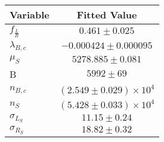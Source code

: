 \begin{tabular}[t]{lc}
\hline
Variable &Fitted Value\\
\hline\hline
$f_{\frac{L}{R}}$&$0.461\pm0.025$\\
\hline
$\lambda_{B,c}$&$-0.000424\pm0.000095$\\
\hline
$\mu_S$&$5278.885\pm0.081$\\
\hline
B&$5992\pm69$\\
\hline
$n_{B,c}$&$(2.549\pm0.029)\times 10^4$\\
\hline
$n_S$&$(5.428\pm0.033)\times 10^4$\\
\hline
$\sigma_{L_S}$&$11.15\pm0.24$\\
\hline
$\sigma_{R_S}$&$18.82\pm0.32$\\
\hline
\end{tabular}